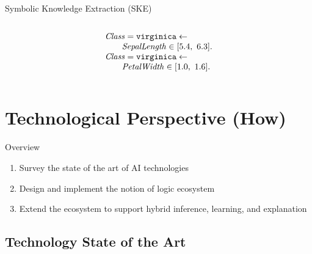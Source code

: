 \documentclass[presentation]{beamer}\mode<presentation>{\usetheme{AMSBolognaFC}}
\begin{document}
\begin{frame}[allowframebreaks]{Symbolic Knowledge Extraction (SKE)}
\begin{columns}
\begin{column}{.53\linewidth}
\[\begin{array}{l}
                    \mathit{Class} = \mathtt{virginica} \leftarrow \\ 
                        \qquad \mathit{SepalLength} \in [5.4,\ 6.3] \mathtt{.}
                    \\
                    \mathit{Class} = \mathtt{virginica} \leftarrow \\ 
                        \qquad \mathit{PetalWidth} \in [1.0,\ 1.6] \mathtt{.}
                \end{array}    
            \]
        \end{column}
    \end{columns}
\end{frame}



\section{Technological Perspective (How)}

\begin{frame}{Overview}
    \begin{enumerate}
        \item Survey the state of the art of AI technologies
        
        \vfill

        \item Design and implement the notion of logic ecosystem 
        
        \vfill

        \item Extend the ecosystem to support hybrid inference, learning, and explanation
    \end{enumerate}
\end{frame}

\subsection{Technology State of the Art}
\end{document}
